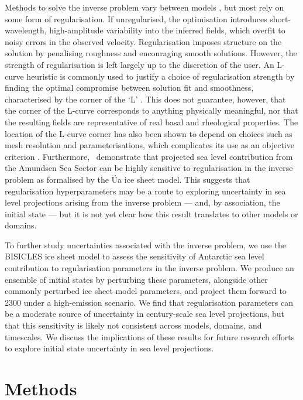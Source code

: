 \documentclass[journal abbreviation, manuscript]{copernicus}
\begin{document}
Methods to solve the inverse problem vary between models \citep[see e.g.][]{barnesTransferabilityAdjointInversion2021}, but most rely on some form of regularisation. If unregularised, the optimisation introduces short-wavelength, high-amplitude variability into the inferred fields, which overfit to noisy errors in the observed velocity. Regularisation imposes structure on the solution by penalising roughness and encouraging smooth solutions. However, the strength of regularisation is left largely up to the discretion of the user. An L-curve heuristic is commonly used to justify a choice of regularisation strength by finding the optimal compromise between solution fit and smoothness, characterised by the corner of the `L' \citep{hansenAnalysisDiscreteIllPosed1992}. This does not guarantee, however, that the corner of the L-curve corresponds to anything physically meaningful, nor that the resulting fields are representative of real basal and rheological properties. The location of the L-curve corner has also been shown to depend on choices such as mesh resolution and parameterisations, which complicates its use as an objective criterion \citep{wolovickRegularizationLcurvesIce2023}. Furthermore,~\cite{rosierCalibratedSeaLevel2025} demonstrate that projected sea level contribution from the Amundsen Sea Sector can be highly sensitive to regularisation in the inverse problem as formalised by the \'Ua ice sheet model. This suggests that regularisation hyperparameters may be a route to exploring uncertainty in sea level projections arising from the inverse problem --- and, by association, the initial state --- but it is not yet clear how this result translates to other models or domains.

To further study uncertainties associated with the inverse problem, we use the BISICLES ice sheet model to assess the sensitivity of Antarctic sea level contribution to regularisation parameters in the inverse problem. We produce an ensemble of initial states by perturbing these parameters, alongside other commonly perturbed ice sheet model parameters, and project them forward to 2300 under a high-emission scenario. We find that regularisation parameters can be a moderate source of uncertainty in century-scale sea level projections, but that this sensitivity is likely not consistent across models, domains, and timescales. We discuss the implications of these results for future research efforts to explore initial state uncertainty in sea level projections.

\section{Methods}
\end{document}
